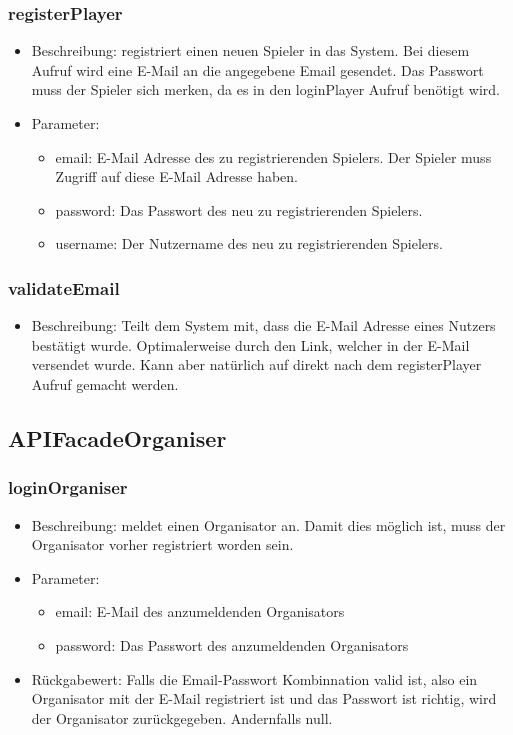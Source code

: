 \documentclass[a4paper]{scrreprt}
\begin{document}
	\subsubsection{registerPlayer}
	\begin{itemize}
		\item Beschreibung: registriert einen neuen Spieler in das System. Bei diesem Aufruf wird eine E-Mail an die angegebene Email gesendet. Das Passwort muss der Spieler sich merken, da es in den loginPlayer Aufruf benötigt wird.
		\item Parameter:
		\begin{itemize}
			\item email: E-Mail Adresse des zu registrierenden Spielers. Der Spieler muss Zugriff auf diese E-Mail Adresse haben.
			\item password: Das Passwort des neu zu registrierenden Spielers.
			\item username: Der Nutzername des neu zu registrierenden Spielers.
		\end{itemize}
	\end{itemize}
	\subsubsection{validateEmail}
	\begin{itemize}
		\item Beschreibung: Teilt dem System mit, dass die E-Mail Adresse eines Nutzers bestätigt wurde. Optimalerweise durch den Link, welcher in der E-Mail versendet wurde. Kann aber natürlich auf direkt nach dem registerPlayer Aufruf gemacht werden.
	\end{itemize}
	\subsection{APIFacadeOrganiser}
	\subsubsection{loginOrganiser}
	\begin{itemize}
		\item Beschreibung: meldet einen Organisator an. Damit dies möglich ist, muss der Organisator vorher registriert worden sein.
		\item Parameter:
		\begin{itemize}
			\item email: E-Mail des anzumeldenden Organisators
			\item password: Das Passwort des anzumeldenden Organisators
		\end{itemize}
		\item Rückgabewert: Falls die Email-Passwort Kombinnation valid ist, also ein Organisator mit der E-Mail registriert ist und das Passwort ist richtig, wird der Organisator zurückgegeben. Andernfalls null.
	\end{itemize}
\end{document}
